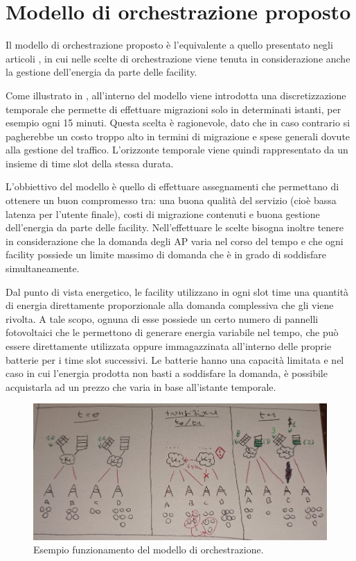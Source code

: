 %
%
\section{Modello di orchestrazione proposto}
\label{sec:modello-di-orchestrazione-proposto}

Il modello di orchestrazione proposto è l'equivalente a quello presentato negli articoli \cite{assignment-patterns}, \cite{analytics-mec} in cui nelle scelte di orchestrazione viene tenuta in considerazione anche la gestione dell'energia da parte delle facility.

Come illustrato in \cite{analytics-mec}, all'interno del modello viene introdotta una discretizzazione temporale che permette di effettuare migrazioni solo in determinati istanti, per esempio ogni 15 minuti. Questa scelta è ragionevole, dato che in caso contrario si pagherebbe un costo troppo alto in termini di migrazione e spese generali dovute alla gestione del traffico. L'orizzonte temporale viene quindi rappresentato da un insieme di time slot della stessa durata.

L'obbiettivo del modello è quello di effettuare assegnamenti che permettano di ottenere un buon compromesso tra: una buona qualità del servizio (cioè bassa latenza per l'utente finale), costi di migrazione contenuti e buona gestione dell'energia da parte delle facility. Nell'effettuare le scelte bisogna inoltre tenere in considerazione che la domanda degli AP varia nel corso del tempo e che ogni facility possiede un limite massimo di domanda che è in grado di soddisfare simultaneamente.

Dal punto di vista energetico, le facility utilizzano in ogni slot time una quantità di energia direttamente proporzionale alla domanda complessiva che gli viene rivolta. A tale scopo, ognuna di esse possiede un certo numero di pannelli fotovoltaici che le permettono di generare energia variabile nel tempo, che può essere direttamente utilizzata oppure immagazzinata all'interno delle proprie batterie per i time slot successivi. Le batterie hanno una capacità limitata e nel caso in cui l'energia prodotta non basti a soddisfare la domanda, è possibile acquistarla ad un prezzo che varia in base all'istante temporale.

\begin{figure}[t]
    \centering
    \includegraphics[width = 150mm]{img/example-assigments.jpg}
    \caption{Esempio funzionamento del modello di orchestrazione.}
    \label{fig:esempio-assegnamenti}
\end{figure}

